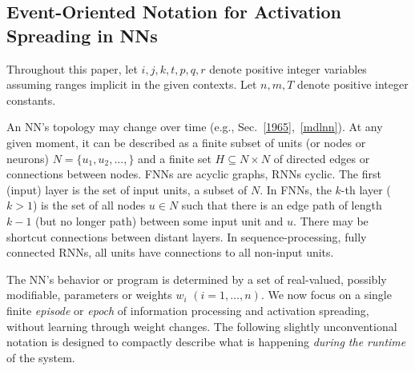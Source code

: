 \documentclass[letterpaper]{article}
\begin{document}
\begin{CJK*}{UTF8}{gbsn}


\section{Event-Oriented Notation for Activation Spreading in NNs}
\label{notation}

Throughout this paper, let $i,j,k,t,p,q,r$ denote positive integer variables
assuming ranges implicit in the given contexts. 
Let $n,m,T$ denote positive integer constants.

An NN's topology may change over time (e.g., Sec.~\ref{1965},~\ref{mdlnn}).
At any given moment, 
it can be described as a finite subset of units (or nodes or neurons)  $N=\{u_1,u_2, \ldots, \}$ and a finite set 
$H \subseteq N \times N$ of directed edges or connections between nodes.
FNNs are acyclic graphs, RNNs cyclic. 
The first (input) layer is the set of input units, a subset of $N$.
In FNNs, the $k$-th layer ($k>1$) is the set of all nodes 
$u \in N$ such that there is an edge path of length $k-1$ (but no longer path) between some input unit and $u$.
There may be shortcut connections between distant layers.
In sequence-processing, fully connected 
 RNNs, all units have connections to all non-input units.



The NN's behavior or program is determined by a set of real-valued, possibly modifiable,
parameters or weights 
$w_i$ $(i=1,\ldots,n)$.
We now focus on a single finite {\em episode} or {\em epoch} of information processing 
and activation spreading, without learning through weight changes.
The following slightly unconventional 
notation is designed to compactly describe what is happening
 {\em during the runtime} of the system. 



\end{CJK*}
\end{document}
